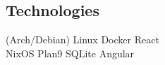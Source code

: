 \documentclass[letterpaper]{resume} %
\begin{document}
\begin{minipage}[t]{0.33\textwidth}
\subsection{Technologies}

(Arch/Debian) Linux  \textbullet{} Docker \textbullet{} React \\

NixOS \textbullet{} Plan9 \textbullet{} SQLite \textbullet{} Angular \\

\sectionspace %

\end{minipage} %
\hfill
%
%
\end{document}
